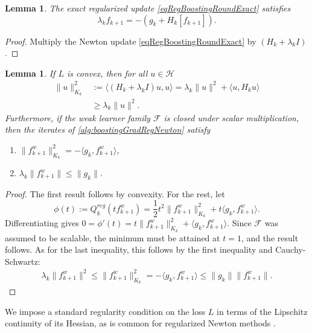 \documentclass{article}
\theoremstyle{plain}
\newtheorem{lemma}[theorem]{Lemma}
\theoremstyle{definition}
\theoremstyle{remark}
\begin{document}
\begin{lemma}\label{lemmaLambdafMinusGkHk}
    The exact regularized update \eqref{eqRegBoostingRoundExact} satisfies
    \begin{equation}\label{eqRegNewtonUpdateDirection}
        \lambda_k f_{k+1} = -\left( g_k + H_k[f_{k+1}] \right).
    \end{equation}
\end{lemma}
\begin{proof}
    Multiply the Newton update \eqref{eqRegBoostingRoundExact} by $(H_k + \lambda_k I)$.
\end{proof}



\begin{lemma}\label{lemmaUsefulProperties}
    If $L$ is convex, then for all $u\in \mathcal{H}$
    \begin{align*}
        \|u\|_{K_k}^2  
        &:= \langle(H_k + \lambda_k I)u, u\rangle =  \lambda_k \|u\|^2 + \langle u, H_k u\rangle \\
        &\geq \lambda_k \|u\|^2.
    \end{align*}
    Furthermore, if the weak learner family $\mathcal{F}$ is closed under scalar multiplication, then the iterates of \cref{alg:boostingGradRegNewton} satisfy
    \begin{enumerate}
        \item $ \|f_{k+1}^w\|_{K_k}^2 = -\langle g_k, f_{k+1}^w \rangle$,
        \item $\lambda_k \|f_{k+1}^w\| \leq \|g_k\|$.
    \end{enumerate}
\end{lemma}
\begin{proof}
    The first result follows by convexity. For the rest, let
    $$\phi(t) := Q_k^{reg}(t f_{k+1}^w) = \frac{1}{2}t^2 \|f_{k+1}^w\|_{K_k}^2 + t \langle g_k, f_{k+1}^w\rangle.$$
    Differentiating gives $0 = \phi'(t) = t \|f_{k+1}^w\|_{K_k}^2 + \langle g_k, f_{k+1}^w\rangle$. Since $\mathcal{F}$ was assumed to be scalable, the minimum must be attained at  $t=1$, and the result follows. As for the last inequality, this follows by the first inequality and Cauchy-Schwartz:
    \begin{align*}
        \lambda_k \|f_{k+1}^w\|^2 \leq \|f_{k+1}^w\|_{K_k}^2 = -\langle g_k, f_{k+1}^w \rangle \leq \|g_k\| \|f_{k+1}^w\|. 
    \end{align*}
\end{proof}

We impose a standard regularity condition on the loss $L$ in terms of the Lipschitz continuity of its Hessian, as is common for regularized Newton methods \cite{2006CubicRegularizationOfNewtonMethodAndItsGlobalPerformance, 2008AcceleratingTheCubicRegularizationOfNewtonsMethodOnConvexProblems, 2023RegularizedNewtonMethodWithGlobalConvergence, 2024GradientRegularizationOfNewtonMethodWithBregmanDistances}.
\end{document}
